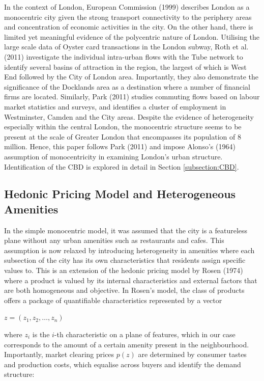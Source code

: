 \documentclass{article}
\begin{document}
In the context of London, European Commission (1999) describes London as a monocentric city given the strong transport connectivity to the periphery areas and concentration of economic activities in the city. On the other hand, there is limited yet meaningful evidence of the polycentric nature of London. Utilising the large scale data of Oyster card transactions in the London subway, Roth et al. (2011) investigate the individual intra-urban flows with the Tube network to identify several basins of attraction in the region, the largest of which is West End followed by the City of London area. Importantly, they also demonstrate the significance of the Docklands area as a destination where a number of financial firms are located. Similarly, Park (2011) studies commuting flows based on labour market statistics and surveys, and identifies a cluster of employment in Westminster, Camden and the City areas. Despite the evidence of heterogeneity especially within the central London, the monocentric structure seems to be present at the scale of Greater London that encompasses its population of 8 million. Hence, this paper follows Park (2011) and impose Alonso's (1964) assumption of monocentricity in examining London's urban structure. Identification of the CBD is explored in detail in Section \ref{subsection:CBD}.

\subsection{Hedonic Pricing Model and Heterogeneous Amenities} \label{subsection:hedonic} 
In the simple monocentric model, it was assumed that the city is a featureless plane without any urban amenities such as restaurants and cafes. This assumption is now relaxed by introducing heterogeneity in amenities where each subsection of the city has its own characteristics that residents assign specific values to. This is an extension of the hedonic pricing model by Rosen (1974) where a product is valued by its internal characteristics and external factors that are both homogeneous and objective. In Rosen's model, the class of products offers a package of quantifiable characteristics represented by a vector 

\begin{center}
    $z = \left( z _ { 1 } , z _ { 2 } , \dots , z _ { n } \right)$
\end{center}

where $z_i$ is the $i$-th characteristic on a plane of features, which in our case corresponds to the amount of a certain amenity present in the neighbourhood. Importantly, market clearing prices $p(z)$ are determined by consumer tastes and production costs, which equalise across buyers and identify the demand structure:
\end{document}
